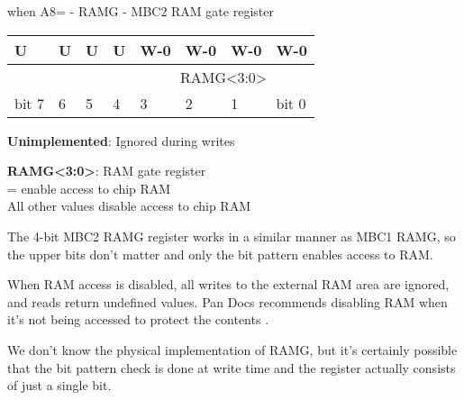 \begin{register}[H]
  \caption{ when A8= - RAMG - MBC2 RAM gate register}
  {
    \ttfamily
    \begin{tabularx}{\textwidth}{|X|X|X|X|X|X|X|X|}
      \hline
      U & U & U & U & W-0 & W-0 & W-0 & W-0 \\
      \hline
      \cellcolor{LightGray} & \cellcolor{LightGray} & \cellcolor{LightGray} & \cellcolor{LightGray} & \multicolumn{4}{c|}{RAMG<3:0>} \\
      \hline
      bit 7 & 6 & 5 & 4 & 3 & 2 & 1 & bit 0 \\
      \hline
    \end{tabularx}
  }

  \begin{description}[leftmargin=5em, style=nextline]
    \item[bit 7-4]
      \textbf{Unimplemented}: Ignored during writes
    \item[bit 3-0]
      \textbf{RAMG<3:0>}: RAM gate register \\
      = enable access to chip RAM \\
      All other values disable access to chip RAM
  \end{description}
\end{register}

The 4-bit MBC2 RAMG register works in a similar manner as MBC1 RAMG, so the
upper bits don't matter and only the bit pattern  enables access to
RAM.

When RAM access is disabled, all writes to the external RAM area
 are ignored, and reads return undefined values. Pan Docs
recommends disabling RAM when it's not being accessed to protect the contents
\cite{pandocs}.

\begin{speculation}
  We don't know the physical implementation of RAMG, but it's certainly
  possible that the  bit pattern check is done at write time and the
  register actually consists of just a single bit.
\end{speculation}

